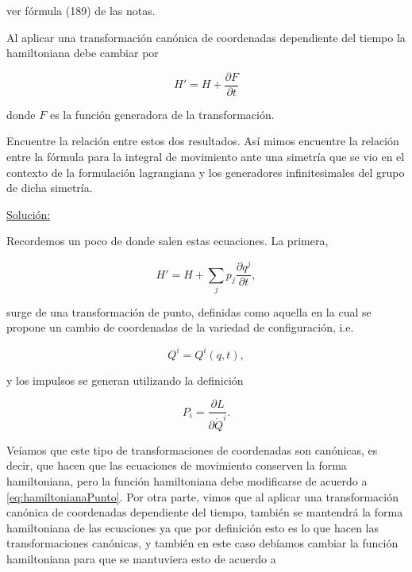 \documentclass[a4paper,10pt]{article}
\numberwithin{equation}{section}
\begin{document}
ver fórmula (189) de las notas.

\vspace{.3cm}

Al aplicar una transformación canónica de coordenadas dependiente del tiempo la 
hamiltoniana debe cambiar por 

$$
H' = H + \frac{\partial F}{\partial t}
$$

donde $F$ es la función generadora de la transformación. 

\vspace{.3cm}

Encuentre la relación entre estos dos resultados. Así mimos encuentre la relación 
entre la fórmula para la integral de movimiento ante una simetría que se vio en el 
contexto de la formulación lagrangiana y los generadores infinitesimales del grupo 
de dicha simetría.

\vspace{.3cm}

\underline{Solución:} \vspace{.3cm}

Recordemos un poco de donde salen estas ecuaciones. La primera,

\begin{equation} 
H' = H + \sum_j p_j \frac{\partial q^j}{\partial t},
\label{eq:hamiltonianaPunto}
\end{equation}

surge de una transformación de punto, definidas como aquella en la cual se propone 
un cambio de coordenadas de la variedad de configuración, i.e. 

\begin{equation}
 Q^i = Q^i(q,t),
\end{equation}

y los impulsos se generan utilizando la definición 

\begin{equation}
P_i = \frac{\partial L}{\partial \dot{Q}^i}.
\end{equation}

Veíamos que este tipo de transformaciones de coordenadas son canónicas, es decir, 
que hacen que las ecuaciones de movimiento conserven la forma hamiltoniana, pero 
la función hamiltoniana debe modificarse de acuerdo a \eqref{eq:hamiltonianaPunto}. 
Por otra parte, vimos que al aplicar una transformación canónica de coordenadas dependiente 
del tiempo, también se mantendrá la forma hamiltoniana de las ecuaciones ya que por 
definición esto es lo que hacen las transformaciones canónicas, y también en este 
caso debíamos cambiar la función hamiltoniana para que se mantuviera esto de acuerdo 
a 
\end{document}
